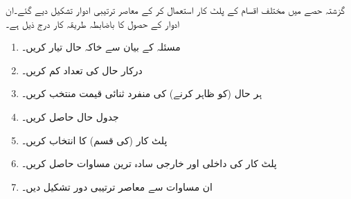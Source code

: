 گزشتہ حصے میں مختلف اقسام کے پلٹ کار استعمال کر کے    معاصر ترتیبی ادوار تشکیل  دیے  گئے۔ان  ادوار کے حصول کا  باضابطہ طریقہ کار درج ذیل ہے۔
\begin{enumerate}
    \item
     مسئلہ کے بیان سے  خاکہ حال  تیار کریں۔
    \item
     درکار حال کی تعداد کم کریں۔
    \item
     ہر حال   (کو ظاہر کرنے) کی  منفرد  ثنائی  قیمت    منتخب  کریں۔
    \item
      جدول حال  حاصل کریں۔
    \item
     پلٹ  کار (کی  قسم)  کا انتخاب کریں۔
    \item
     پلٹ کار کی  داخلی اور خارجی سادہ ترین مساوات حاصل کریں۔
    \item
    ان  مساوات سے معاصر ترتیبی دور تشکیل دیں۔
\end{enumerate}
 
